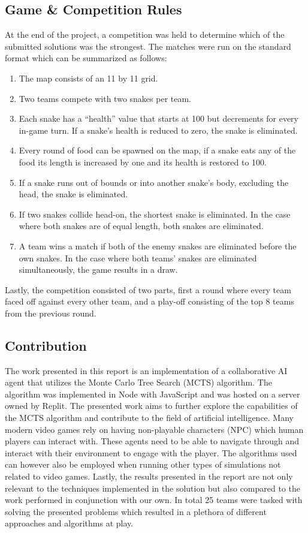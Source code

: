 \documentclass[a4paper,12pt]{article}
\begin{document}
\subsection{Game \& Competition Rules}
At the end of the project, a competition was held to determine which of the submitted solutions was the strongest. The matches were run on the standard format which can be summarized as follows:

\begin{enumerate}
    \item The map consists of an 11 by 11 grid.
    \item Two teams compete with two snakes per team.
    \item Each snake has a “health” value that starts at 100 but decrements for every in-game turn. If a snake’s health is reduced to zero, the snake is eliminated.
    \item Every round of food can be spawned on the map, if a snake eats any of the food its length is increased by one and its health is restored to 100.
    \item If a snake runs out of bounds or into another snake's body, excluding the head, the snake is eliminated.
    \item If two snakes collide head-on, the shortest snake is eliminated. In the case where both snakes are of equal length, both snakes are eliminated.
    \item A team wins a match if both of the enemy snakes are eliminated before the own snakes. In the case where both teams’ snakes are eliminated simultaneously, the game results in a draw.
\end{enumerate}
Lastly, the competition consisted of two parts, first a round where every team faced off against every other team, and a play-off consisting of the top 8 teams from the previous round.


\subsection{Contribution}
The work presented in this report is an implementation of a collaborative AI agent that utilizes the Monte Carlo Tree Search (MCTS) algorithm. The algorithm was implemented in Node with JavaScript and was hosted on a server owned by Replit. The presented work aims to further explore the capabilities of the MCTS algorithm and contribute to the field of artificial intelligence. Many modern video games rely on having non-playable characters (NPC) which human players can interact with. These agents need to be able to navigate through and interact with their environment to engage with the player. The algorithms used can however also be employed when running other types of simulations not related to video games. Lastly, the results presented in the report are not only relevant to the techniques implemented in the solution but also compared to the work performed in conjunction with our own. In total 25 teams were tasked with solving the presented problems which resulted in a plethora of different approaches and algorithms at play. 
\end{document}

